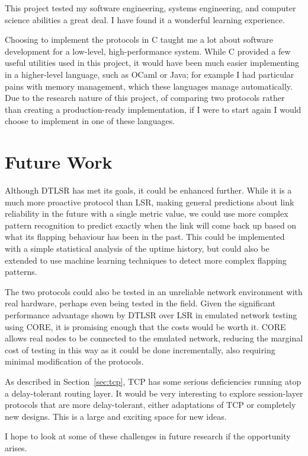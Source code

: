 \documentclass[withindex,glossary,openany]{cam-thesis}
\begin{document}
This project tested my software engineering, systems engineering, and computer science abilities a great deal. I have found it a wonderful learning experience.

Choosing to implement the protocols in C taught me a lot about software development for a low-level, high-performance system. While C provided a few useful utilities used in this project, it would have been much easier implementing in a higher-level language, such as OCaml or Java; for example I had particular pains with memory management, which these languages manage automatically. Due to the research nature of this project, of comparing two protocols rather than creating a production-ready implementation, if I were to start again I would choose to implement in one of these languages.

\section{Future Work}

Although DTLSR has met its goals, it could be enhanced further. While it is a much more proactive protocol than LSR, making general predictions about link reliability in the future with a single metric value, we could use more complex pattern recognition to predict exactly when the link will come back up based on what its flapping behaviour has been in the past. This could be implemented with a simple statistical analysis of the uptime history, but could also be extended to use machine learning techniques to detect more complex flapping patterns.

The two protocols could also be tested in an unreliable network environment with real hardware, perhaps even being tested in the field. Given the significant performance advantage shown by DTLSR over LSR in emulated network testing using CORE, it is promising enough that the costs would be worth it. CORE allows real nodes to be connected to the emulated network, reducing the marginal cost of testing in this way as it could be done incrementally, also requiring minimal modification of the protocols.

As described in Section~\ref{sec:tcp}, TCP has some serious deficiencies running atop a delay-tolerant routing layer. It would be very interesting to explore session-layer protocols that are more delay-tolerant, either adaptations of TCP or completely new designs. This is a large and exciting space for new ideas.

I hope to look at some of these challenges in future research if the opportunity arises.











\end{document}
